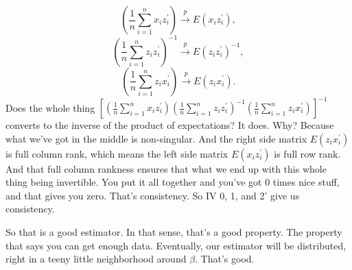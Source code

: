 \documentclass[11pt,a4paper]{amsart}
\theoremstyle{plain}
\theoremstyle{definition}
\begin{document}
 	\[	(\frac{1}{n}\sum_{i=1}^{n}x_{i}z^{'}_{i}) \stackrel{p}{\longrightarrow} E(x_{i}z^{'}_{i}),	\]
 	\[	(\frac{1}{n}\sum_{i=1}^{n}z_{i}z^{'}_{i})^{-1} \stackrel{p}{\longrightarrow} E(z_{i}z^{'}_{i})^{-1},	\]
 	\[	(\frac{1}{n}\sum_{i=1}^{n}z_{i}x^{'}_{i})  \stackrel{p}{\longrightarrow} E(z_{i}x^{'}_{i}).	\]
 	Does the whole thing $\left[(\frac{1}{n}\sum_{i=1}^{n}x_{i}z^{'}_{i})(\frac{1}{n}\sum_{i=1}^{n}z_{i}z^{'}_{i})^{-1}(\frac{1}{n}\sum_{i=1}^{n}z_{i}x^{'}_{i})\right]^{-1}$ converts to the inverse of the product of expectations? It does. Why? Because what we've got in the middle is non-singular. And the right side matrix $E(z_{i}x^{'}_{i})$ is full column rank, which means the left side matrix $E(x_{i}z^{'}_{i})$ is full row rank. And that full column rankness ensures that what we end up with this whole thing being invertible. You put it all together and you've got $0$ times nice stuff, and that gives you zero. That's consistency. So  IV 0, 1, and 2' give us consistency.\par 
 	 So that is a good estimator. In that sense, that's a good property. The property that says you can get enough data. Eventually, our estimator will be distributed, right in a teeny little neighborhood around $\beta$. That's good.
\end{document}

